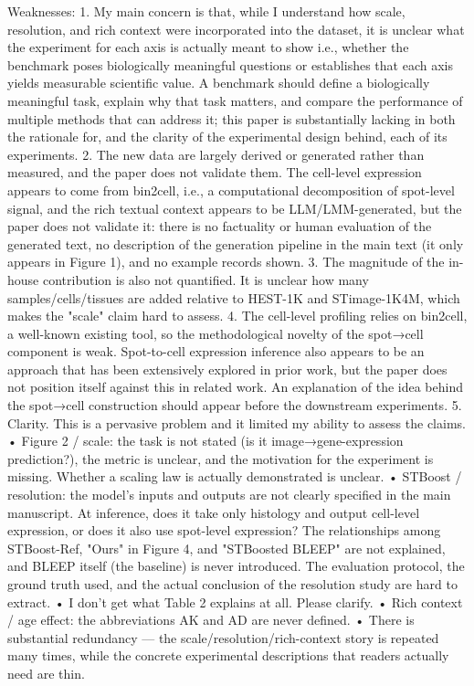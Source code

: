 Weaknesses: 1. My main concern is that, while I understand how scale, resolution, and rich context were incorporated into the dataset, it is unclear what the experiment for each axis is actually meant to show i.e., whether the benchmark poses biologically meaningful questions or establishes that each axis yields measurable scientific value. A benchmark should define a biologically meaningful task, explain why that task matters, and compare the performance of multiple methods that can address it; this paper is substantially lacking in both the rationale for, and the clarity of the experimental design behind, each of its experiments. 2. The new data are largely derived or generated rather than measured, and the paper does not validate them. The cell-level expression appears to come from bin2cell, i.e., a computational decomposition of spot-level signal, and the rich textual context appears to be LLM/LMM-generated, but the paper does not validate it: there is no factuality or human evaluation of the generated text, no description of the generation pipeline in the main text (it only appears in Figure 1), and no example records shown. 3. The magnitude of the in-house contribution is also not quantified. It is unclear how many samples/cells/tissues are added relative to HEST-1K and STimage-1K4M, which makes the "scale" claim hard to assess. 4. The cell-level profiling relies on bin2cell, a well-known existing tool, so the methodological novelty of the spot→cell component is weak. Spot-to-cell expression inference also appears to be an approach that has been extensively explored in prior work, but the paper does not position itself against this in related work. An explanation of the idea behind the spot→cell construction should appear before the downstream experiments. 5. Clarity. This is a pervasive problem and it limited my ability to assess the claims. • Figure 2 / scale: the task is not stated (is it image→gene-expression prediction?), the metric is unclear, and the motivation for the experiment is missing. Whether a scaling law is actually demonstrated is unclear. • STBoost / resolution: the model's inputs and outputs are not clearly specified in the main manuscript. At inference, does it take only histology and output cell-level expression, or does it also use spot-level expression? The relationships among STBoost-Ref, "Ours" in Figure 4, and "STBoosted BLEEP" are not explained, and BLEEP itself (the baseline) is never introduced. The evaluation protocol, the ground truth used, and the actual conclusion of the resolution study are hard to extract. • I don’t get what Table 2 explains at all. Please clarify. • Rich context / age effect: the abbreviations AK and AD are never defined. • There is substantial redundancy — the scale/resolution/rich-context story is repeated many times, while the concrete experimental descriptions that readers actually need are thin.

